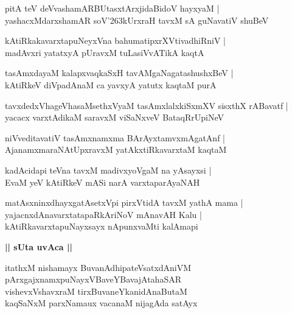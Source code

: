 \documentclass[twoside,12pt,openright]{book}
\def\S{\char'263}
\newcounter{shloka}[chapter]
\def\uvaca#1{\centerline{{\large\textbf{#1}}}}
\begin{document}
\begin{shloka}%
pitA teV deVvashamARBUtasxtArxjidaBidoV hayxyaM |\\
yashacxMdarxshamAR soV\S kUrxraH tavxM sA guNavatiV shuBeV 
\end{shloka}

\begin{shloka}%
kAtiRkakavarxtapuNeyxVna bahumatipxrXVtivadhiRniV |\\
madAvxri yatatxyA pUravxM tuLasiVvATikA kaqtA 
\end{shloka}

\begin{shloka}%
tasAmxdayaM kalapxvaqkaSxH tavAMgaNagatashushxBeV |\\
kAtiRkeV diVpadAnaM ca yavxyA yatutx kaqtaM purA 
\end{shloka}

\begin{shloka}%
tavxdedxVhageVhasaMsethxVyaM tasAmxlalxkiSxmXV sisxthX rABavatf |\\
yacacx varxtAdikaM saravxM viSaNxveV BataqRrUpiNeV 
\end{shloka}

\begin{shloka}%
niVveditavatiV tasAmxnamxma BArAyxtamvxmAgatAnf |\\
AjanamxmaraNAtUpxravxM yatAkxtiRkavarxtaM kaqtaM 
\end{shloka}

\begin{shloka}%
kadAcidapi teVna tavxM madivxyoVgaM na yAsayxsi |\\
EvaM yeV kAtiRkeV mASi narA varxtaparAyaNAH 
\end{shloka}

\begin{shloka}%
matAsxninxdhayxgatAsetxVpi pirxVtidA tavxM yathA mama |\\
yajacnxdAnavarxtatapaRkAriNoV mAnavAH Kalu |\\
kAtiRkavarxtapuNayxsayx nApunxvaMti kalAmapi
\end{shloka}

\uvaca{|| sUta uvAca ||}

\begin{shloka}%
itathxM nishamayx BuvanAdhipateVsatxdAniVM \\
pArxgajxnamxpuNayxVBaveYBavajAtahaSAR \\
vishevxVshavxraM tirxBuvaneYkanidAnaButaM \\
kaqSaNxM parxNamaux vacanaM nijagAda satAyx
\end{shloka}
\end{document}
